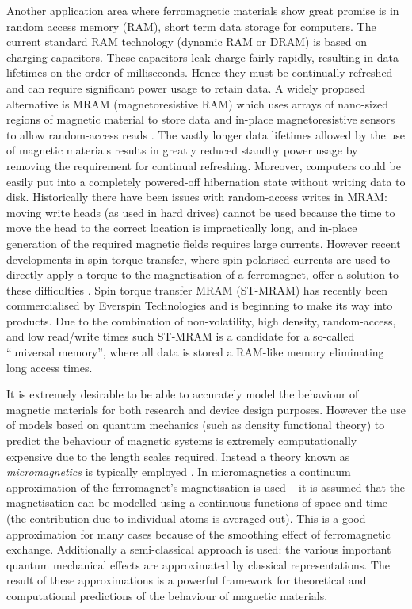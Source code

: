 Another application area where ferromagnetic materials show great promise is in random access memory (RAM), \ie short term data storage for computers.
The current standard RAM technology (dynamic RAM or DRAM) is based on charging capacitors.
These capacitors leak charge fairly rapidly, resulting in data lifetimes on the order of milliseconds.
Hence they must be continually refreshed and can require significant power usage to retain data.
A widely proposed alternative is MRAM (magnetoresistive RAM) which uses arrays of nano-sized regions of magnetic material to store data and in-place magnetoresistive sensors to allow random-access reads \cite[Sec. 14.4]{Kronmuller1997}.
The vastly longer data lifetimes allowed by the use of magnetic materials results in greatly reduced standby power usage by removing the requirement for continual refreshing.
Moreover, computers could be easily put into a completely powered-off hibernation state without writing data to disk.
Historically there have been issues with random-access writes in MRAM: moving write heads (as used in hard drives) cannot be used because the time to move the head to the correct location is impractically long, and in-place generation of the required magnetic fields requires large currents.
However recent developments in spin-torque-transfer, where spin-polarised currents are used to directly apply a torque to the magnetisation of a ferromagnet, offer a solution to these difficulties \cite{??ds-st-mram-citation}.
Spin torque transfer MRAM (ST-MRAM) has recently been commercialised by Everspin Technologies \cite{everspin} and is beginning to make its way into products.
Due to the combination of non-volatility, high density, random-access, and low read/write times such ST-MRAM is a candidate for a so-called ``universal memory'', where all data is stored a RAM-like memory eliminating long access times.


It is extremely desirable to be able to accurately model the behaviour of magnetic materials for both research and device design purposes.
However the use of models based on quantum mechanics (such as density functional theory) to predict the behaviour of magnetic systems is extremely computationally expensive due to the length scales required.
Instead a theory known as \emph{micromagnetics} is typically employed \cite{Aharoni1996}.
In micromagnetics a continuum approximation of the ferromagnet's magnetisation is used -- it is  assumed that the magnetisation can be modelled using a continuous functions of space and time (\ie the contribution due to individual atoms is averaged out).
This is a good approximation for many cases because of the smoothing effect of ferromagnetic exchange.
Additionally a semi-classical approach is used: the various important quantum mechanical effects are approximated by classical representations.
The result of these approximations is a powerful framework for theoretical and computational predictions of the behaviour of magnetic materials.

